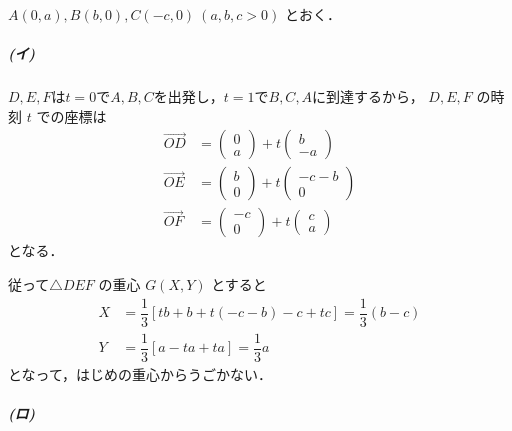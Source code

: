 \documentclass[../../main.tex]{subfiles}
\begin{document}
$A(0,a), B(b,0), C(-c,0) \ (a,b,c > 0)$ とおく．

\subparagraph{(イ)}

$D,E,F$は$t=0$で$A,B,C$を出発し，$t=1$で$B,C,A$に到達するから，
$D,E,F$ の時刻 $t$ での座標は
\begin{align}
  \overrightarrow{OD} &=
  \begin{pmatrix} 0 \\ a
  \end{pmatrix} + t
  \begin{pmatrix} b \\ -a
  \end{pmatrix} \\
  \overrightarrow{OE} &=
  \begin{pmatrix} b \\ 0
  \end{pmatrix} + t
  \begin{pmatrix} -c-b \\ 0
  \end{pmatrix}  \\
  \overrightarrow{OF} &=
  \begin{pmatrix} -c \\ 0
  \end{pmatrix} + t
  \begin{pmatrix} c \\ a
  \end{pmatrix} \label{eq:1}
\end{align}
となる．

従って$\triangle DEF$ の重心 $G(X,Y)$ とすると
\begin{align}
  X &= \dfrac{1}{3} [ tb + b + t(-c-b) - c + tc ] = \dfrac{1}{3} (b-c) \\
  Y &= \dfrac{1}{3} [ a - ta + ta ] = \dfrac{1}{3} a
\end{align}
となって，はじめの重心からうごかない．

\subparagraph{(ロ)}
\end{document}

